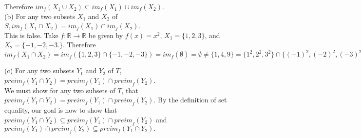 \documentclass[12pt, letterpaper]{article}
\newcommand{\R}{\mathbb{R}}
\begin{document}
	Therefore ${im}_f(X_1 \cup X_2) \subseteq im_f(X_1) \cup im_f(X_2)$.\\
(b) For any two subsets $X_1$ and $X_2$ of $S, i m_f\left(X_1 \cap X_2\right)=i m_f\left(X_1\right) \cap i m_f\left(X_2\right)$.\\
	This is false.  Take $f: \R \to \R$ be given by $f(x) = x^2$, $X_1 = \{1,2,3\}$, and $X_2 = \{-1,-2,-3.\}$.  Therefore $im_f(X_1 \cap X_2) = im_f(\{1,2,3\} \cap \{-1,-2,-3\}) = im_f(\emptyset) = \emptyset \neq \{1,4,9\} = \{1^2,2^2,3^2\} \cap \{(-1)^2,(-2)^2,(-3)^2\} = im_f(X_1) \cap im_f(X_2).$

(c) For any two subsets $Y_1$ and $Y_2$ of $T$, $preim_f(Y_1 \cap Y_2)=preim_f (Y_1) \cap {preim}_f(Y_2)$.\\
We must show for any two subsets of $T$, that $preim_f(Y_1 \cap Y_2)=preim_f (Y_1) \cap {preim}_f(Y_2)$.  By the definition of set equality, our goal is now to show that $preim_f(Y_1 \cap Y_2)   \subseteq preim_f (Y_1) \cap {preim}_f(Y_2)$ and $preim_f (Y_1) \cap {preim}_f(Y_2) \subseteq preim_f(Y_1 \cap Y_2).$ 
\end{document}
